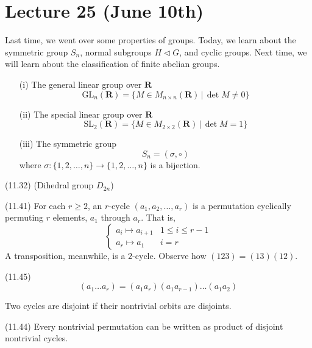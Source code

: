 \section*{Lecture 25 (June 10th)}
Last time, we went over some properties of groups. Today, we learn about the symmetric group $S_{n}$, normal subgroups $H\triangleleft G$, and cyclic groups. Next time, we will learn about the classification of finite abelian groups.
\newline
\begin{ex}
\begin{itemize}
\item[(i)] The general linear group over ${\bm R}$
\[\mathrm{GL}_{n}({\bm R})=\{M\in M_{n\times n}({\bm R}) \,|\,\det M\ne 0 \}\]
\item[(ii)] The special linear group over ${\bm R}$
\[\mathrm{SL}_{2}({\bm R})=\{M\in M_{2\times 2}({\bm R}) \,|\, \det M=1\}\]
\item[(iii)] The symmetric group
\[S_{n}=(\sigma  ,\circ)\]
where $\sigma : \{1,2,\ldots ,n\}\rightarrow \{1,2,\ldots ,n\} $ is a bijection.
\end{itemize}
\end{ex}
\vspace{2ex}
\begin{defi}
(11.32) (Dihedral group $D_{2n}$) 
\end{defi}
\vspace{2ex}
\begin{defi}
(11.41) For each $r\geq 2$, an $r$-cycle $(a_1,a_2,\ldots ,a_{r})$ is a permutation cyclically permuting $r$ elements, $a_1$ through $a_{r}$. That is, 
\[\begin{cases}
a_i\mapsto a_{i+1}&1\leq i\leq r-1 \\
a_{r}\mapsto a_{1}&i=r
\end{cases}\]
A transposition, meanwhile, is a $2$-cycle. Observe how $(123)=(13)(12)$. 
\end{defi}
\vspace{2ex}
\begin{lem}
(11.45) 
\[(a_1\ldots a_{r})=(a_1a_{r})(a_1a_{r-1})\ldots (a_1a_2)\]
\end{lem}
\vspace{2ex}
\begin{rmk}
Two cycles are disjoint if their nontrivial orbits are disjoints. 
\end{rmk}
\vspace{2ex}
\begin{prop}
(11.44) Every nontrivial permutation can be written as product of disjoint nontrivial cycles.
\end{prop}
